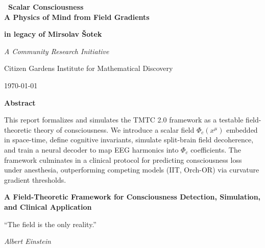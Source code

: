 \documentclass[12pt]{article}
\theoremstyle{plain}
\begin{document}
\begin{titlepage}
    \centering
    \vspace*{3cm}

    {\Huge\bfseries\ {Scalar Consciousness\\ A Physics of Mind from Field Gradients
} 
 \par}
    \vspace{0.5cm}
    {\LARGE\bfseries in legacy of Mirsolav Šotek \par}

    \vspace{2cm}
    {\Large\itshape A Community Research Initiative \par}
    \vspace{0.5cm}
    {\normalsize Citizen Gardens Institute for Mathematical Discovery \par}
    {\normalsize \today \par}

    \vfill

    {\bfseries Abstract \par}
    \vspace{0.5em}
    \begin{minipage}{0.85\textwidth}
        \small
 This report formalizes and simulates the TMTC 2.0 framework as a testable field-theoretic theory of consciousness. We introduce a scalar field $\Phi_c(x^\mu)$ embedded in space-time, define cognitive invariants, simulate split-brain field decoherence, and train a neural decoder to map EEG harmonics into $\Phi_c$ coefficients. The framework culminates in a clinical protocol for predicting consciousness loss under anesthesia, outperforming competing models (IIT, Orch-OR) via curvature gradient thresholds.

    \end{minipage}

\end{titlepage}


\clearpage
\clearpage
\thispagestyle{empty}
\begin{center}
    \Large\textbf{A Field-Theoretic Framework for Consciousness Detection, Simulation, and Clinical Application}
\end{center}

\vspace{2em}

\epigraph{“The field is the only reality.”}{\textit{
Albert Einstein}}

\vspace{1em}
\end{document}
